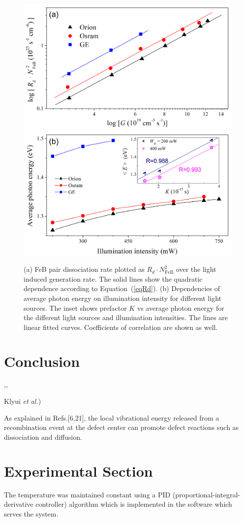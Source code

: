 \documentclass{WileyMSP-template}
\begin{document}
\begin{figure}
\centering
  \includegraphics[width=0.4\linewidth]{Fig6a.png}
  \includegraphics[width=0.4\linewidth]{Fig6b.png}
  \caption{
  (a) FeB pair dissociation rate plotted as $R_d\cdot N_\mathrm{FeB}^2$ over the light induced
  generation rate. The solid lines show the quadratic dependence according to Equation~(\ref{eqRd}).
  (b) Dependencies of average photon energy on illumination intensity for different light sources.
  The inset shows prefactor $K$ vs average photon energy for the different light sources and illumination intensities.
  The lines are linear fitted curves. Coefficients of correlation are shown as well.
  }
  \label{fig6}
\end{figure}



\section{Conclusion}\label{SecConsl}
\cite{KLAASSEN953,ROUGIEUX2018,FeB:kinetic},\cite{Brad2022,AugerSi2022,EBLSHADE},

Klyui \emph{et al.}\cite{KostRefl2000})

As explained in Refs.[6,21], the local vibrational energy released
from a recombination event at the defect center can promote defect reactions such as dissociation
and diffusion.


\section{Experimental Section}
\label{SecExp}

The temperature was maintained constant using a PID (proportional-integral-derivative controller) algorithm which is implemented in the software which serves the system.
\end{document}
